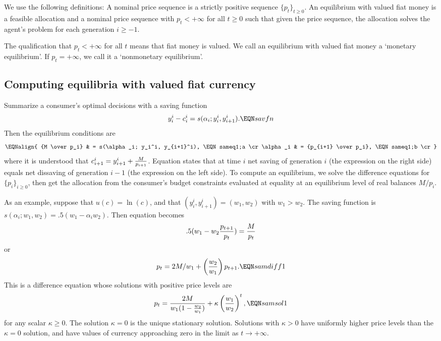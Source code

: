   We use  the following definitions:
\medskip
{}  A nominal price  sequence is a strictly positive
sequence $\{p_t\}_{t \geq 0}$.
\medskip
{}  An equilibrium with valued fiat money
is a feasible allocation and a nominal price sequence with $p_t < +\infty$
for all $t\geq 0$
 such
that given the price sequence, the allocation solves the agent's
problem for each generation $i\geq -1$.
\medskip


\noindent The qualification that $p_t < + \infty$ for all $t$  means that
fiat money is valued. We call an equilibrium with valued fiat money
a `monetary equilibrium'.  If $p_t = + \infty$, we   call it a `nonmonetary equilibrium'.



\subsection{Computing equilibria with valued fiat currency}\label{sec:Meqlog}%
   Summarize a  consumer's optimal decisions with
a saving function
$$ y_i^i - c_i^i = s(\alpha_i; y_i^i, y_{i+1}^i). \EQN savfn $$
Then the equilibrium conditions  are
$$ \EQNalign{ {M  \over p_i} & = s(\alpha_i; y_i^i, y_{i+1}^i), \EQN sameq1;a \cr
                \alpha_i & = {p_{i+1} \over p_i}, \EQN sameq1;b \cr }$$
where it is understood that
$ c_{i+1}^i = y_{i+1}^i + {M \over p_{i+1}} $.
Equation  states that at time $i$   net  saving of generation $i$ (the expression on the right side) equals
 net dissaving of generation $i-1$ (the expression on the left side).  To compute an equilibrium, we solve the difference equations
 for $\{p_i\}_{i\geq 0}$,  then get the allocation
from the consumer's budget constraints evaluated at equality
at an equilibrium level of real balances $M/p_i$.

As an example, suppose that $u(c) = \ln(c)$,
and that $(y^i_i, y^i_{i+1}) = (w_1, w_2)$ with $w_1 > w_2$.
  The saving function is
$ s(\alpha_i; w_1, w_2) = .5(w_1 - \alpha_i w_2)$.   Then
equation  becomes
$$ .5(w_1 - w_2 {p_{t+1} \over p_t}) = {M \over p_t} $$
or
$$ p_t = 2 M/ w_1 + \left({w_2 \over    w_1}\right) p_{t+1} .\EQN samdiff1 $$
This is a difference equation whose solutions
with positive price levels are
$$ p_t = {2 M \over w_1 (1 - {w_2 \over w_1})} + \kappa
  \left({w_1\over w_2}\right)^t, \EQN samsol1 $$
for any scalar $\kappa \geq 0$.
The solution  $\kappa=0$ is the unique stationary solution.  Solutions
with $\kappa >0$ have uniformly higher price levels than the $\kappa=0$ solution,
and have  values of currency approaching zero in the limit as $t \rightarrow +\infty$.

